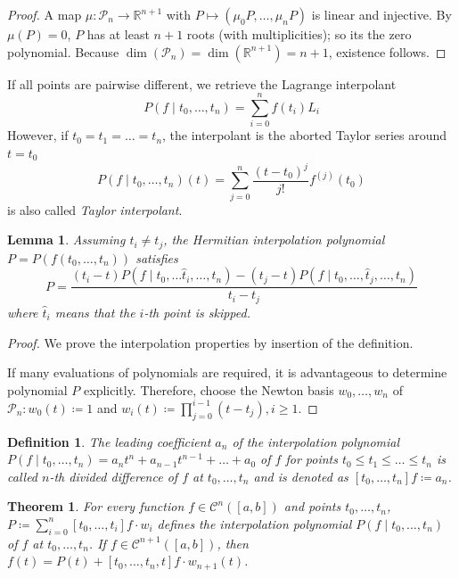 \documentclass[a4paper]{article}
\newcounter{lecref}[section]
\numberwithin{lecref}{section}
\theoremstyle{break}
\newtheorem{thm}[lecref]{Theorem}
\newtheorem{definition}[lecref]{Definition}
\newtheorem{lemma}[lecref]{Lemma}
\begin{document}
\begin{proof}
  A map $\mu: \mathcal P_n \to \mathbb R^{n+1}$ with $P \mapsto (\mu_0 P, \dots, \mu_n P)$ is linear and injective.
  By $\mu(P) = 0$, $P$ has at least $n+1$ roots (with multiplicities); so its the zero polynomial.
  Because $\dim(\mathcal P_n) = \dim(\mathbb R^{n+1}) = n + 1$, existence follows.
\end{proof}

If all points are pairwise different, we retrieve the Lagrange interpolant
\[ P(f \mid t_0, \dots, t_n) = \sum_{i=0}^n f(t_i) L_i \]
However, if $t_0 = t_1 = \dots = t_n$, the interpolant is the aborted Taylor series around $t = t_0$
\[ P(f \mid t_0, \dots, t_n)(t) = \sum_{j=0}^n \frac{(t - t_0)^j}{j!} f^{(j)}(t_0) \]
is also called \emph{Taylor interpolant}.

\begin{lemma}
  \label{lemma:4-8}
  Assuming $t_i \neq t_j$, the Hermitian interpolation polynomial $P = P(f(t_0, \dots, t_n))$
  satisfies \[ P = \frac{(t_i - t) P(f \mid t_0, \dots \hat{t}_i, \dots, t_n) - (t_j - t) P(f \mid t_0, \dots, \hat t_j, \dots, t_n)}{t_i - t_j} \]
  where $\hat t_i$ means that the $i$-th point is skipped.
\end{lemma}

\begin{proof}
  We prove the interpolation properties by insertion of the definition.

  If many evaluations of polynomials are required, it is advantageous to determine polynomial $P$ explicitly.
  Therefore, choose the Newton basis $w_0, \dots, w_n$ of $\mathcal P_n: w_0(t) \coloneqq 1$ and $w_i(t) \coloneqq \prod_{j=0}^{i-1} (t - t_j), i \geq 1$.
\end{proof}

\begin{definition}
  \label{definition:4-9}
  The leading coefficient $a_n$ of the interpolation polynomial $P(f \mid t_0, \dots, t_n) = a_n t^n + a_{n-1} t^{n-1} + \dots + a_0$ of $f$ for points $t_0 \leq t_1 \leq \dots \leq t_n$ is called $n$-th \emph{divided difference} of $f$ at $t_0, \dots, t_n$ and is denoted as $[t_0, \dots, t_n] f \coloneqq a_n$.
\end{definition}

\begin{thm}
  \label{theorem:4-10}
  For every function $f \in \mathcal C^n([a,b])$ and points $t_0, \dots, t_n$, $P \coloneqq \sum_{i=0}^n [t_0, \dots, t_i] f \cdot w_i$ defines the interpolation polynomial $P(f \mid t_0, \dots, t_n)$ of $f$ at $t_0, \dots, t_n$.
  If $f \in \mathcal C^{n+1}([a,b])$, then $f(t) = P(t) + [t_0, \dots, t_n, t] f \cdot w_{n+1}(t)$.
\end{thm}
\end{document}
